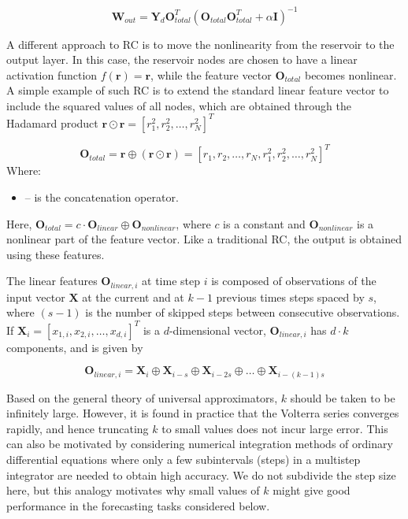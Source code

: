 \documentclass[11pt, oneside]{article}
\begin{document}
\begin{equation}
    \mathbf{W}_{out} = \mathbf{Y}_d \mathbf{O}_{total}^T (\mathbf{O}_{total} \mathbf{O}_{total}^T + \alpha \mathbf{I})^{-1}
\end{equation}

A different approach to RC is to move the nonlinearity from the reservoir to the output layer. In this case, the reservoir nodes are chosen to have a linear activation function \(f(\mathbf{r}) = \mathbf{r}\), while the feature vector \(\mathbf{O}_{total}\) becomes nonlinear. A simple example of such RC is to extend the standard linear feature vector to include the squared values of all nodes, which are obtained through the Hadamard product \( \mathbf{r} \odot \mathbf{r} =  [r_1^2, r_2^2, \ldots, r_N^2]^T \)

\begin{equation}
    \mathbf{O}_{total} = \mathbf{r} \oplus (\mathbf{r} \odot \mathbf{r}) = [r_1, r_2, \ldots, r_N, r_1^2, r_2^2, \ldots, r_N^2]^T
\end{equation}
Where:
\begin{itemize}[noitemsep, leftmargin=4cm, label={}]
    \item [\(\oplus\)] -- is the concatenation operator.

\end{itemize}
Here, \(\mathbf{O}_{total} = c \cdot \mathbf{O}_{linear} \oplus \mathbf{O}_{nonlinear}\), where \(c\) is a constant
and \(\mathbf{O}_{nonlinear}\) is a nonlinear part of the feature vector. Like a traditional RC, the output is obtained using these features.

The linear features \(\mathbf{O}_{linear,i}\) at time step \(i\) is composed of observations of the input vector \(\mathbf{X}\) at the current and at \(k-1\) previous times steps spaced by \(s\), where \((s-1)\) is the number of skipped steps between consecutive observations. If \(\mathbf{X}_i = [x_{1,i}, x_{2,i}, \ldots, x_{d,i}]^T\) is a \(d\)-dimensional vector, \(\mathbf{O}_{linear,i}\) has \(d \cdot k\) components, and is given by

\begin{equation}
    \mathbf{O}_{linear,i} = \mathbf{X}_i \oplus \mathbf{X}_{i-s} \oplus \mathbf{X}_{i-2s} \oplus \ldots \oplus \mathbf{X}_{i-(k-1)s}
\end{equation}

Based on the general theory of universal approximators, \(k\) should be taken to be infinitely large. However, it is found in practice that the Volterra series converges rapidly, and hence truncating \(k\) to small values does not incur large error. This can also be motivated by considering numerical integration methods of ordinary differential equations where only a few subintervals (steps) in a multistep integrator are needed to obtain high accuracy. We do not subdivide the step size here, but this analogy motivates why small values of \(k\) might give good performance in the forecasting tasks considered below.
\end{document}
